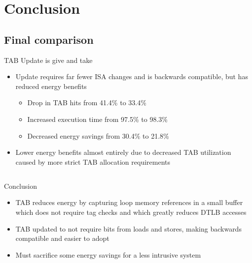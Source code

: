 \documentclass{beamer}
\begin{document}
\section{Conclusion}
\subsection{Final comparison}
\begin{frame}{TAB Update is give and take}
   \begin{itemize}
      \item Update requires far fewer ISA changes and is backwards compatible, but
         has reduced energy benefits
         \begin{itemize}
            \item Drop in TAB hits from 41.4\% to 33.4\%
            \item Increased execution time from 97.5\% to 98.3\%
            \item Decreased energy savings from 30.4\% to 21.8\%
         \end{itemize}
      \item Lower energy benefits almost entirely due to decreased TAB utilization
         caused by more strict TAB allocation requirements
   \end{itemize}
\end{frame}
\subsection{}
\begin{frame}{Conclusion}
   \begin{itemize}
      \item TAB reduces energy by capturing loop memory references in a small buffer
         which does not require tag checks and which greatly reduces DTLB accesses
      \item TAB updated to not require bits from loads and stores, making 
         backwards compatible and easier to adopt
      \item Must sacrifice some energy savings for a less intrusive system
   \end{itemize}
\end{frame}
\end{document}

